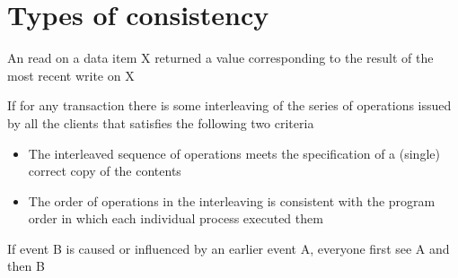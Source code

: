 \documentclass{article}[18pt]
\begin{document}
\section{Types of consistency}
\begin{definition}
	An read on a data item X returned a value corresponding to the result of the most recent write on X
\end{definition}
\begin{definition}
	If for any transaction there is some interleaving of the series of operations issued by all the clients that satisfies the following two criteria
	\begin{itemize}
		\item The interleaved sequence of operations meets the specification of a (single) correct copy of the contents
		\item The order of operations in the interleaving is consistent with the program order in which each individual process executed them
	\end{itemize}
\end{definition}

\begin{definition}
If event B is caused or influenced by an earlier event A, everyone first see A and then B
\end{definition}
\end{document}
